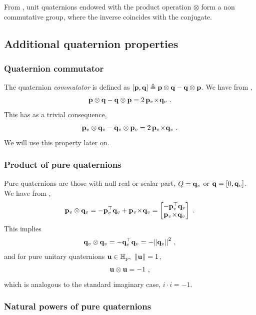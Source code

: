 From , unit quaternions endowed with the product operation $\otimes$ form a non commutative group, where the inverse coincides with the conjugate. 


\subsection{Additional quaternion properties}

\subsubsection{Quaternion commutator}

The quaternion \emph{commutator} is defined as $[{\bf p},{\bf q}]\triangleq{\bf p}\otimes{\bf q}-{\bf q}\otimes{\bf p}$. We have from ,
%
\begin{align}
{\bf p}\otimes{\bf q}-{\bf q}\otimes{\bf p} = 2\,{\bf p}_v\!\times\!{\bf q}_v
~.
\label{equ:quatCommutator}
\end{align}
%
This has as a trivial consequence,
%
\begin{align}
{\bf p}_v\otimes{\bf q}_v-{\bf q}_v\otimes{\bf p}_v = 2\,{\bf p}_v\!\times\!{\bf q}_v
~.
\label{equ:quatCommutatorPure}
\end{align}
%
We will use this property later on.


\subsubsection{Product of pure quaternions}

Pure quaternions are those with null real or scalar part, $Q={\bf q}_v$ or ${\bf q}=[0,{\bf q}_v]$. We have from ,
%
\begin{align}
{\bf p}_v\otimes{\bf q}_v 
= -{\bf p}_v^{\top}{\bf q}_v + {\bf p}_v\!\times\!{\bf q}_v
= \begin{bmatrix}
-{\bf p}_v^{\top}{\bf q}_v \\
{\bf p}_v\!\times\!{\bf q}_v
\end{bmatrix}~.
\label{equ:quatProdPure}
\end{align}
%
This implies
%
\begin{align}
{\bf q}_v\otimes{\bf q}_v = -{\bf q}_v^{\top}{\bf q}_v = -{\left\|{\bf q}_v\right\|}^2~,
\label{equ:quatPureSquared}
\end{align}
%
and for pure unitary quaternions ${\bf u}\in{\mathbb H}_p,~ {\left\|{\bf u}\right\|}=1$,
%
\begin{align}
{\bf u}\otimes{\bf u} = -1
~,
\end{align}
%
which is analogous to the standard imaginary case, $i\cdot i=-1$.

\subsubsection{Natural powers of pure quaternions}

